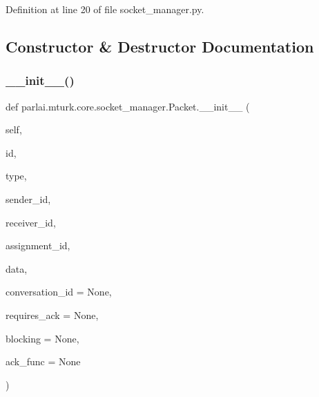 Definition at line 20 of file socket\+\_\+manager.\+py.



\subsection{Constructor \& Destructor Documentation}
\mbox{\label{classparlai_1_1mturk_1_1core_1_1socket__manager_1_1Packet_a25f1f794ffd01fb70e9b6b8acd0a33be}} 
\subsubsection{\texorpdfstring{\+\_\+\+\_\+init\+\_\+\+\_\+()}{\_\_init\_\_()}}
{\footnotesize\ttfamily def parlai.\+mturk.\+core.\+socket\+\_\+manager.\+Packet.\+\_\+\+\_\+init\+\_\+\+\_\+ (\begin{DoxyParamCaption}\item[{}]{self,  }\item[{}]{id,  }\item[{}]{type,  }\item[{}]{sender\+\_\+id,  }\item[{}]{receiver\+\_\+id,  }\item[{}]{assignment\+\_\+id,  }\item[{}]{data,  }\item[{}]{conversation\+\_\+id = {\ttfamily None},  }\item[{}]{requires\+\_\+ack = {\ttfamily None},  }\item[{}]{blocking = {\ttfamily None},  }\item[{}]{ack\+\_\+func = {\ttfamily None} }\end{DoxyParamCaption})}

